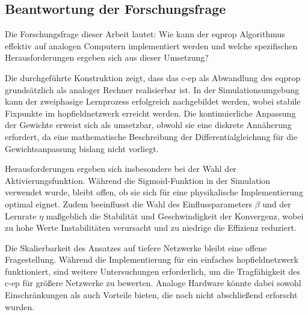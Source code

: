 \subsection{Beantwortung der Forschungsfrage}

Die Forschungsfrage dieser Arbeit lautet: Wie kann der \gls{eqprop} Algorithmus effektiv auf analogen Computern implementiert werden und welche spezifischen Herausforderungen ergeben sich aus dieser Umsetzung?

Die durchgeführte Konstruktion zeigt, dass das \gls{c-ep} als Abwandlung des \gls{eqprop} grundsätzlich als analoger Rechner realisierbar ist. In der Simulationsumgebung kann der zweiphasige Lernprozess erfolgreich nachgebildet werden, wobei stabile Fixpunkte im \gls{hopfieldnetzwerk} erreicht werden. Die kontinuierliche Anpassung der Gewichte erweist sich als umsetzbar, obwohl sie eine diskrete Annäherung erfordert, da eine mathematische Beschreibung der Differentialgleichung für die Gewichtsanpassung bislang nicht vorliegt.

Herausforderungen ergeben sich insbesondere bei der Wahl der Aktivierungsfunktion. Während die Sigmoid-Funktion in der Simulation verwendet wurde, bleibt offen, ob sie sich für eine physikalische Implementierung optimal eignet. Zudem beeinflusst die Wahl des Einflussparameters \(\beta\) und der Lernrate \(\eta\) maßgeblich die Stabilität und Geschwindigkeit der Konvergenz, wobei zu hohe Werte Instabilitäten verursacht und zu niedrige die Effizienz reduziert.

Die Skalierbarkeit des Ansatzes auf tiefere Netzwerke bleibt eine offene Fragestellung. Während die Implementierung für ein einfaches \gls{hopfieldnetzwerk} funktioniert, sind weitere Untersuchungen erforderlich, um die Tragfähigkeit des \gls{c-ep} für größere Netzwerke zu bewerten. Analoge Hardware könnte dabei sowohl Einschränkungen als auch Vorteile bieten, die noch nicht abschließend erforscht wurden.

